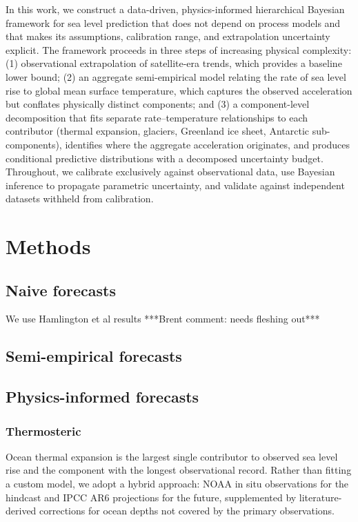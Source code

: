 \documentclass[11pt]{article}
\begin{document}
In this work, we construct a data-driven, physics-informed hierarchical Bayesian framework for sea level prediction that does not depend on process models and that makes its assumptions, calibration range, and extrapolation uncertainty explicit. The framework proceeds in three steps of increasing physical complexity: (1) observational extrapolation of satellite-era trends, which provides a baseline lower bound; (2) an aggregate semi-empirical model relating the rate of sea level rise to global mean surface temperature, which captures the observed acceleration but conflates physically distinct components; and (3) a component-level decomposition that fits separate rate--temperature relationships to each contributor (thermal expansion, glaciers, Greenland ice sheet, Antarctic sub-components), identifies where the aggregate acceleration originates, and produces conditional predictive distributions with a decomposed uncertainty budget. Throughout, we calibrate exclusively against observational data, use Bayesian inference to propagate parametric uncertainty, and validate against independent datasets withheld from calibration.

\section{Methods} 
\subsection{Naive forecasts}

We use Hamlington et al results ***Brent comment: needs fleshing out***

\subsection{Semi-empirical forecasts} 

\subsection{Physics-informed forecasts}
	\subsubsection{Thermosteric}

Ocean thermal expansion is the largest single contributor to observed sea level rise and the component with the longest observational record. Rather than fitting a custom model, we adopt a hybrid approach: NOAA in situ observations for the hindcast and IPCC AR6 projections for the future, supplemented by literature-derived corrections for ocean depths not covered by the primary observations.
\end{document}
